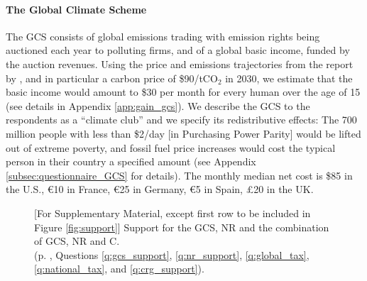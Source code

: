 \begin{tcolorbox}\label{box:GCS}
  \paragraph{The Global Climate Scheme} The GCS consists of global emissions trading with emission rights being auctioned each year to polluting firms, and of a global basic income, funded by the auction revenues. Using the price and emissions trajectories from the report by \cite{stern_report_2017}, and in particular a carbon price of \$90/tCO$_\text{2}$ in 2030, we estimate that the basic income would amount to \$30 per month for every human over the age of 15 (see details in Appendix \ref{app:gain_gcs}). %
  We describe the GCS to the respondents as a ``climate club'' and we specify its redistributive effects: The 700 million people with less than \$2/day [in Purchasing Power Parity] would be lifted out of extreme poverty, and fossil fuel price increases would cost the typical person in their country a specified amount (see Appendix \ref{subsec:questionnaire_GCS} for details). The monthly median net cost is \$85 in the U.S., \euro{}10 in France, \euro{}25 in Germany, \euro{}5 in Spain, £20 in the UK.
\end{tcolorbox}


\setcounter{figure}{0}
\renewcommand{\thefigure}{S\arabic{figure}}
\begin{figure}[h!]
    \caption[Support for the Global Climate Scheme]{[For Supplementary Material, except first row to be included in Figure \ref{fig:support}] Support for the GCS, NR and the combination of GCS, NR and C. \\(p. \pageref{subsec:questionnaire_GCS}, Questions \ref{q:gcs_support}, \ref{q:nr_support}, \ref{q:global_tax}, \ref{q:national_tax}, and \ref{q:crg_support}).%
    }\label{fig:support_binary}
\end{figure}

